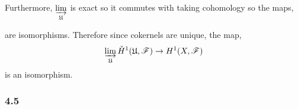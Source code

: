 \documentclass[12pt]{article}
\begin{document}
\begin{enumerate}
\begin{center}
\end{center}
Furthermore, $\varinjlim\limits_{\mathfrak{U}}$ is exact so it commutes with taking cohomology so the maps,
\begin{center}
\end{center}
are isomorphisms. Therefore since cokernels are unique, the map,
\[ \varinjlim\limits_{\mathfrak{U}} \check{H}^1(\mathfrak{U}, \mathscr{F}) \to H^1(X, \mathscr{F}) \]
is an isomorphism. 


\renewcommand{\Q}{\mathbb{Q}}
\end{enumerate}


\subsubsection{4.5}
\end{document}
